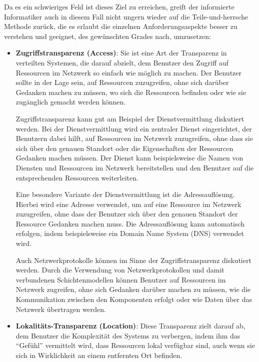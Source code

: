 \documentclass[../vs-script-first-v01.tex]{subfiles}
\begin{document}
Da es ein schwieriges Feld ist dieses Ziel zu erreichen, greift der informierte Informatiker auch in diesem Fall nicht ungern wieder auf die Teile-und-herrsche Methode zurück, die es erlaubt die einzelnen Anforderungsaspekte besser zu verstehen und geeignet, des gewünschten Grades nach, umzusetzen:
\begin{itemize}
  \item  \textbf{Zugriffstransparenz (Access)}: Sie ist eine Art der Transparenz in verteilten Systemen, die darauf abzielt, dem Benutzer den Zugriff auf Ressourcen im Netzwerk so einfach wie möglich zu machen. Der Benutzer sollte in der Lage sein, auf Ressourcen zuzugreifen, ohne sich darüber Gedanken machen zu müssen, wo sich die Ressourcen befinden oder wie sie zugänglich gemacht werden können.

        Zugriffstransparenz kann gut am Beispiel der Dienstvermittlung diskutiert werden. Bei der Dienstvermittlung wird ein zentraler Dienst eingerichtet, der Benutzern dabei hilft, auf Ressourcen im Netzwerk zuzugreifen, ohne dass sie sich über den genauen Standort oder die Eigenschaften der Ressourcen Gedanken machen müssen. Der Dienst kann beispielsweise die Namen von Diensten und Ressourcen im Netzwerk bereitstellen und den Benutzer auf die entsprechenden Ressourcen weiterleiten.

        Eine besondere Variante der Dienstvermittlung ist die Adressauflösung. Hierbei wird eine Adresse verwendet, um auf eine Ressource im Netzwerk zuzugreifen, ohne dass der Benutzer sich über den genauen Standort der Ressource Gedanken machen muss. Die Adressauflösung kann automatisch erfolgen, indem beispielsweise ein Domain Name System (DNS) verwendet wird.

        Auch Netzwerkprotokolle können im Sinne der Zugriffstransparenz diskutiert werden. Durch die Verwendung von Netzwerkprotokollen und damit verbundenen Schichtenmodellen können Benutzer auf Ressourcen im Netzwerk zugreifen, ohne sich Gedanken darüber machen zu müssen, wie die Kommunikation zwischen den Komponenten erfolgt oder wie Daten über das Netzwerk übertragen werden.

  \item \textbf{Lokalitäts-Transparenz (Location)}: Diese Transparenz zielt darauf ab, dem Benutzer die Komplexität des Systems zu verbergen, indem ihm das \enquote{Gefühl} vermittelt wird, dass Ressourcen lokal verfügbar sind, auch wenn sie sich in Wirklichkeit an einem entfernten Ort befinden.


\end{itemize}
\end{document}
